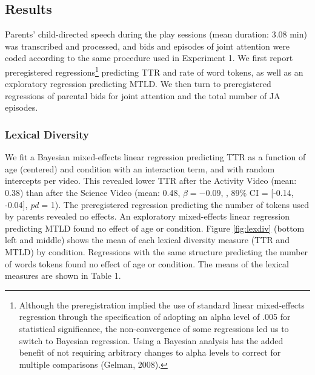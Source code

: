 \documentclass[
  english,
  man]{apa6}
\begin{document}
\hypertarget{results-1}{%
\subsection{Results}\label{results-1}}

Parents' child-directed speech during the play sessions (mean duration: 3.08 min) was transcribed and processed, and bids and episodes of joint attention were coded according to the same procedure used in Experiment 1.
We first report preregistered regressions\footnote{Although the preregistration implied the use of standard linear mixed-effects regression through the specification of adopting an alpha level of .005 for statistical significance, the non-convergence of some regressions led us to switch to Bayesian regression. Using a Bayesian analysis has the added benefit of not requiring arbitrary changes to alpha levels to correct for multiple comparisons (Gelman, 2008).} predicting TTR and rate of word tokens, as well as an exploratory regression predicting MTLD.
We then turn to preregistered regressions of parental bids for joint attention and the total number of JA episodes.

\hypertarget{lexical-diversity-1}{%
\subsubsection{Lexical Diversity}\label{lexical-diversity-1}}

We fit a Bayesian mixed-effects linear regression predicting TTR as a function of age (centered) and condition with an interaction term, and with random intercepts per video.
This revealed lower TTR after the Activity Video (mean: 0.38) than after the Science Video (mean: 0.48, \(\beta=-0.09\), , 89\% CI = {[}-0.14, -0.04{]}, \emph{pd} = 1).
The preregistered regression predicting the number of tokens used by parents revealed no effects.
An exploratory mixed-effects linear regression predicting MTLD found no effect of age or condition.
Figure \ref{fig:lexdiv} (bottom left and middle) shows the mean of each lexical diversity measure (TTR and MTLD) by condition.
Regressions with the same structure predicting the number of words tokens found no effect of age or condition.
The means of the lexical measures are shown in Table 1.
\end{document}
